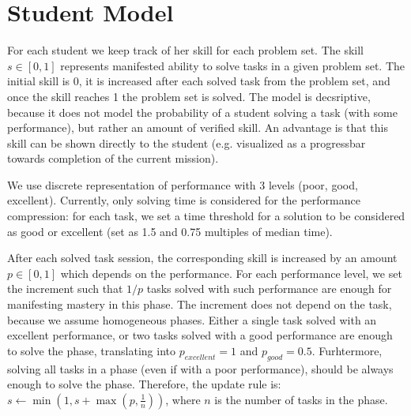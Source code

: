 \section{Student Model}
\label{sec:robomission.student}

For each student we keep track of her skill for each problem set. %
The skill $s \in [0, 1]$ represents manifested ability to solve tasks in
a given problem set. The initial skill is 0, it is increased after each solved
task from the problem set, and once the skill reaches 1 the problem set is solved.
The model is decsriptive, because it does not model the probability of
a student solving a task (with some performance), but rather an amount
of verified skill.
An advantage is that this skill can be shown directly to the student
(e.g. visualized as a progressbar towards completion of the current mission).

We use discrete representation of performance with 3 levels (poor, good,
excellent). Currently, only solving time is considered for the performance
compression: for each task, we set a time threshold for a solution to be
considered as good or excellent
(set as 1.5 and 0.75 multiples of median time).

After each solved task session, the corresponding skill is increased by
an amount $p \in [0, 1]$ which depends on the performance.
For each performance level, we set the increment such that $1/p$ tasks solved
with such performance are enough for manifesting mastery in this phase.
The increment does not depend on the task, because we assume homogeneous
phases.  %
Either a single task solved with an excellent performance, or two
tasks solved with a good performance are enough to solve the phase,
translating into $p_{excellent} = 1$ and $p_{good} = 0.5$.
Furhtermore, solving all tasks in a phase (even if with a poor performance),
should be always enough to solve the phase.
Therefore, the update rule is:
$s \leftarrow \min(1, s + \max(p, \frac{1}{n}))$,
where $n$ is the number of tasks in the phase.

